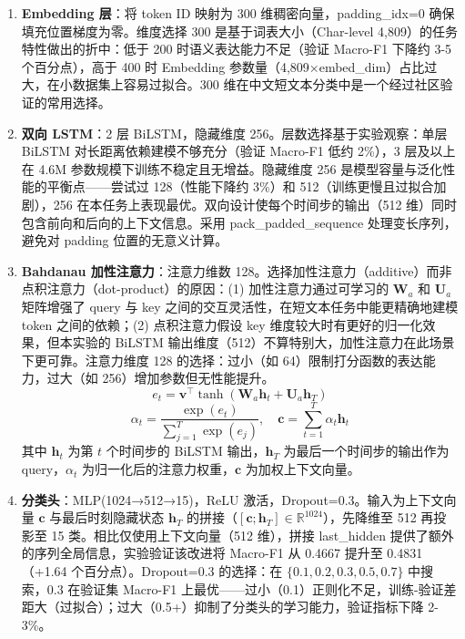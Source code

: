 \begin{enumerate}
\item \textbf{Embedding 层}：将 token ID 映射为 300 维稠密向量，padding\_idx=0 确保填充位置梯度为零。维度选择 300 是基于词表大小（Char-level 4,809）的任务特性做出的折中：低于 200 时语义表达能力不足（验证 Macro-F1 下降约 3-5 个百分点），高于 400 时 Embedding 参数量（4,809×embed\_dim）占比过大，在小数据集上容易过拟合。300 维在中文短文本分类中是一个经过社区验证的常用选择。

\item \textbf{双向 LSTM}：2 层 BiLSTM，隐藏维度 256。层数选择基于实验观察：单层 BiLSTM 对长距离依赖建模不够充分（验证 Macro-F1 低约 2\%），3 层及以上在 4.6M 参数规模下训练不稳定且无增益。隐藏维度 256 是模型容量与泛化性能的平衡点——尝试过 128（性能下降约 3\%）和 512（训练更慢且过拟合加剧），256 在本任务上表现最优。双向设计使每个时间步的输出（512 维）同时包含前向和后向的上下文信息。采用 pack\_padded\_sequence 处理变长序列，避免对 padding 位置的无意义计算。

\item \textbf{Bahdanau 加性注意力}：注意力维数 128。选择加性注意力（additive）而非点积注意力（dot-product）的原因：(1) 加性注意力通过可学习的 $\mathbf{W}_a$ 和 $\mathbf{U}_a$ 矩阵增强了 query 与 key 之间的交互灵活性，在短文本任务中能更精确地建模 token 之间的依赖；(2) 点积注意力假设 key 维度较大时有更好的归一化效果，但本实验的 BiLSTM 输出维度（512）不算特别大，加性注意力在此场景下更可靠。注意力维度 128 的选择：过小（如 64）限制打分函数的表达能力，过大（如 256）增加参数但无性能提升。
\begin{equation}
e_t = \mathbf{v}^\top \tanh(\mathbf{W}_a \mathbf{h}_t + \mathbf{U}_a \mathbf{h}_T)
\end{equation}
\begin{equation}
\alpha_t = \frac{\exp(e_t)}{\sum_{j=1}^{T} \exp(e_j)}, \quad
\mathbf{c} = \sum_{t=1}^{T} \alpha_t \mathbf{h}_t
\end{equation}
其中 $\mathbf{h}_t$ 为第 $t$ 个时间步的 BiLSTM 输出，$\mathbf{h}_T$ 为最后一个时间步的输出作为 query，$\alpha_t$ 为归一化后的注意力权重，$\mathbf{c}$ 为加权上下文向量。

\item \textbf{分类头}：MLP(1024→512→15)，ReLU 激活，Dropout=0.3。输入为上下文向量 $\mathbf{c}$ 与最后时刻隐藏状态 $\mathbf{h}_T$ 的拼接（$[\mathbf{c}; \mathbf{h}_T] \in \mathbb{R}^{1024}$），先降维至 512 再投影至 15 类。相比仅使用上下文向量（512 维），拼接 last\_hidden 提供了额外的序列全局信息，实验验证该改进将 Macro-F1 从 0.4667 提升至 0.4831（+1.64 个百分点）。Dropout=0.3 的选择：在 $\{0.1, 0.2, 0.3, 0.5, 0.7\}$ 中搜索，0.3 在验证集 Macro-F1 上最优——过小（0.1）正则化不足，训练-验证差距大（过拟合）；过大（0.5+）抑制了分类头的学习能力，验证指标下降 2-3\%。
\end{enumerate}

